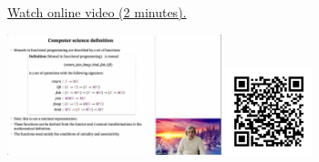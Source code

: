 
\begin{minipage}{10cm}
    \href{https://act4e-spring21.netlify.app/videos/spring2021-monads-a:monad-cs.html}{Watch online video (2 minutes).}
        
    \href{https://act4e-spring21.netlify.app/videos/spring2021-monads-a:monad-cs.html}{\includegraphics[height=3.5cm]{spring2021-monads-a:monad-cs/thumbnails.jpg}}
    \href{https://act4e-spring21.netlify.app/videos/spring2021-monads-a:monad-cs.html}{\includegraphics[height=2.5cm]{spring2021-monads-a:monad-cs/qrcode.png}}
\end{minipage}

